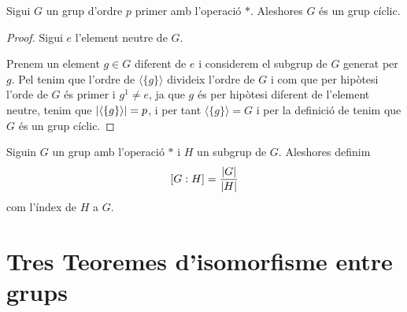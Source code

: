 \documentclass[../Apunts.tex]{subfiles}
\begin{document}
	\begin{corollary}
		Sigui \(G\) un grup d'ordre \(p\) primer amb l'operació \(\ast\). Aleshores \(G\) és un grup cíclic.
		\begin{proof}
			Sigui \(e\) l'element neutre de \(G\).
			
			Prenem un element \(g\in G\) diferent de \(e\) i considerem el subgrup de \(G\) generat per \(g\). Pel  tenim que l'ordre de \(\langle\{g\}\rangle\) divideix l'ordre de \(G\) i com que per hipòtesi l'orde de \(G\) és primer i \(g^{1}\neq e\), ja que \(g\) és per hipòtesi diferent de l'element neutre, tenim que \(\abs{\langle\{g\}\rangle}=p\), i per tant \(\langle\{g\}\rangle=G\) i per la definició de  tenim que \(G\) és un grup cíclic.
		\end{proof}
	\end{corollary}
	\begin{definition}\label{def:l'índex d'un subgrup en un grup}
		Siguin \(G\) un grup amb l'operació \(\ast\) i \(H\) un subgrup de \(G\). Aleshores definim
		\[[G:H]=\frac{\abs{G}}{\abs{H}}\]
		com l'índex de \(H\) a \(G\).
	\end{definition}
	\section{Tres Teoremes d'isomorfisme entre grups}
\end{document}
